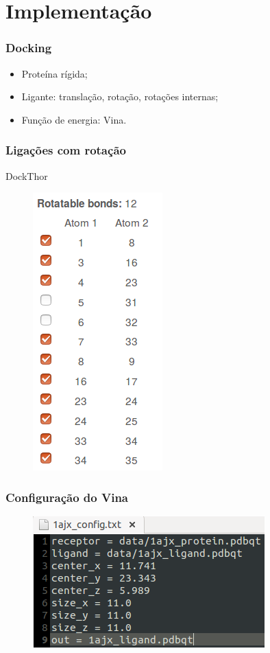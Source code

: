 \documentclass{beamer}
\begin{document}
\section{Implementação} %

\begin{frame}
\frametitle{Docking}
\begin{itemize}
  \item Proteína rígida;
  \item Ligante: translação, rotação, rotações internas;
  \item Função de energia: Vina.
\end{itemize}
\end{frame}

\begin{frame}
\frametitle{Ligações com rotação}
DockThor
\begin{figure}
\includegraphics[width=0.2\linewidth]{dockthor.png}
\end{figure}
\end{frame}

\begin{frame}
\frametitle{Configuração do Vina}
\begin{figure}
\includegraphics[width=0.6\linewidth]{config.png}
\end{figure}
\end{frame}
\end{document}
